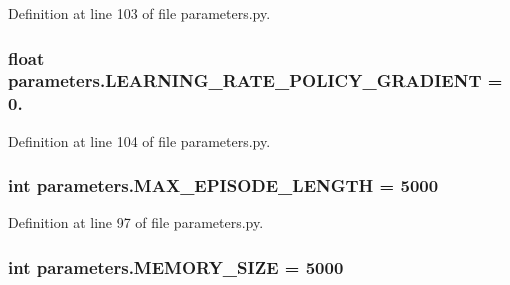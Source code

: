 Definition at line 103 of file parameters.\+py.

\subsubsection[{\texorpdfstring{L\+E\+A\+R\+N\+I\+N\+G\+\_\+\+R\+A\+T\+E\+\_\+\+P\+O\+L\+I\+C\+Y\+\_\+\+G\+R\+A\+D\+I\+E\+NT}{LEARNING_RATE_POLICY_GRADIENT}}]{\setlength{\rightskip}{0pt plus 5cm}float parameters.\+L\+E\+A\+R\+N\+I\+N\+G\+\_\+\+R\+A\+T\+E\+\_\+\+P\+O\+L\+I\+C\+Y\+\_\+\+G\+R\+A\+D\+I\+E\+NT = 0.}\hypertarget{namespaceparameters_aee9255eaabb90fcbf5ba1451159d8279}{}\label{namespaceparameters_aee9255eaabb90fcbf5ba1451159d8279}


Definition at line 104 of file parameters.\+py.

\subsubsection[{\texorpdfstring{M\+A\+X\+\_\+\+E\+P\+I\+S\+O\+D\+E\+\_\+\+L\+E\+N\+G\+TH}{MAX_EPISODE_LENGTH}}]{\setlength{\rightskip}{0pt plus 5cm}int parameters.\+M\+A\+X\+\_\+\+E\+P\+I\+S\+O\+D\+E\+\_\+\+L\+E\+N\+G\+TH = 5000}\hypertarget{namespaceparameters_aa473cc3b100416af3310c6c5a6d19570}{}\label{namespaceparameters_aa473cc3b100416af3310c6c5a6d19570}


Definition at line 97 of file parameters.\+py.

\subsubsection[{\texorpdfstring{M\+E\+M\+O\+R\+Y\+\_\+\+S\+I\+ZE}{MEMORY_SIZE}}]{\setlength{\rightskip}{0pt plus 5cm}int parameters.\+M\+E\+M\+O\+R\+Y\+\_\+\+S\+I\+ZE = 5000}\hypertarget{namespaceparameters_a49f1ad074b5710a98fc783c5627ddade}{}\label{namespaceparameters_a49f1ad074b5710a98fc783c5627ddade}


